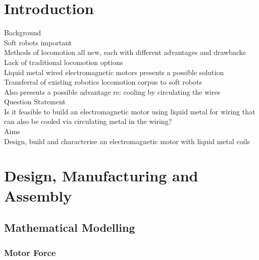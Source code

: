 \documentclass[a4paper,12pt]{article}
\begin{document}
\newpage

\section{Introduction}
Background\\

Soft robots important \\

Methods of locomotion all new, each with different advantages and drawbacks \\

Lack of traditional locomotion options \\

Liquid metal wired electromagnetic motors presents a possible solution \\

Transferral of existing robotics locomotion corpus to soft robots \\

Also presents a possible advantage re: cooling by circulating the wires \\

Question Statement \\

Is it feasible to build an electromagnetic motor using liquid metal for wiring that can also be cooled via circulating metal in the wiring? \\

Aims \\

Design, build and characterise an electromagnetic motor with liquid metal coils\\

\newpage

\section{Design, Manufacturing and Assembly}
\subsection{Mathematical Modelling}
\subsubsection{Motor Force}
\end{document}
